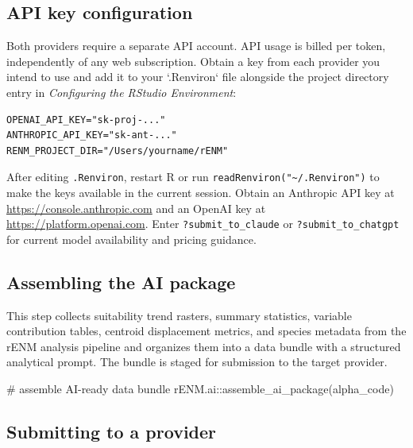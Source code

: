 \documentclass[
  letterpaper,
  DIV=11,
  numbers=noendperiod]{scrartcl}
\newenvironment{Shaded}{\begin{snugshade}}{\end{snugshade}}
\newcommand{\CommentTok}[1]{\textcolor[rgb]{0.37,0.37,0.37}{#1}}
\newcommand{\FunctionTok}[1]{\textcolor[rgb]{0.28,0.35,0.67}{#1}}
\newcommand{\NormalTok}[1]{\textcolor[rgb]{0.00,0.23,0.31}{#1}}
\newcommand{\SpecialCharTok}[1]{\textcolor[rgb]{0.37,0.37,0.37}{#1}}
\begin{document}
\subsection{API key configuration}\label{api-key-configuration}

Both providers require a separate API account. API usage is billed per
token, independently of any web subscription. Obtain a key from each
provider you intend to use and add it to your `.Renviron` file alongside
the project directory entry in \emph{Configuring the RStudio
Environment}:

\begin{verbatim}
OPENAI_API_KEY="sk-proj-..."
ANTHROPIC_API_KEY="sk-ant-..."
RENM_PROJECT_DIR="/Users/yourname/rENM"
\end{verbatim}

After editing \texttt{.Renviron}, restart R or run
\texttt{readRenviron("\textasciitilde{}/.Renviron")} to make the keys
available in the current session. Obtain an Anthropic API key at
\url{https://console.anthropic.com} and an OpenAI key at
\url{https://platform.openai.com}. Enter \texttt{?submit\_to\_claude} or
\texttt{?submit\_to\_chatgpt} for current model availability and pricing
guidance.

\subsection{Assembling the AI package}\label{assembling-the-ai-package}

This step collects suitability trend rasters, summary statistics,
variable contribution tables, centroid displacement metrics, and species
metadata from the rENM analysis pipeline and organizes them into a data
bundle with a structured analytical prompt. The bundle is staged for
submission to the target provider.

\begin{Shaded}
\begin{Highlighting}[]
\CommentTok{\# assemble AI{-}ready data bundle}
\NormalTok{rENM.ai}\SpecialCharTok{::}\FunctionTok{assemble\_ai\_package}\NormalTok{(alpha\_code)}
\end{Highlighting}
\end{Shaded}

\subsection{Submitting to a provider}\label{submitting-to-a-provider}
\end{document}
